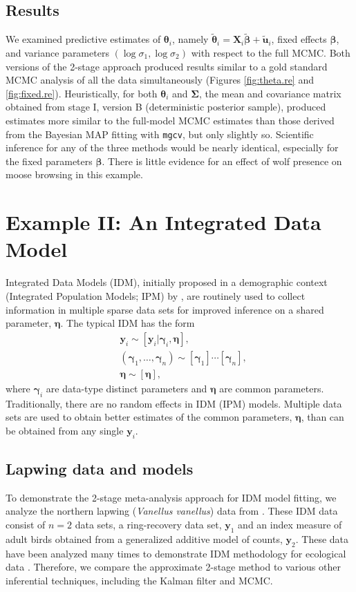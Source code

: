 \documentclass[12pt]{article}
\newcommand{\by}{\mathbf{y}}
\newcommand{\bt}{\boldsymbol{\theta}}
\newcommand{\bb}{\boldsymbol{\beta}}
\newcommand{\bn}{\boldsymbol{\eta}}
\newcommand{\bg}{\boldsymbol{\gamma}}
\newcommand{\bSig}{\boldsymbol{\Sigma}}
\newcommand{\bX}{\mathbf{X}}
\newcommand{\bu}{\mathbf{u}}
\begin{document}
\subsection{Results}
We examined predictive estimates of $\bt_i$, namely $\tilde{\bt}_i = \bX_i\tilde{\bb} + \tilde{\bu}_i$, fixed effects $\bb$, and variance parameters $(\log\sigma_1, \log\sigma_2)$ with respect to the full MCMC. Both versions of the 2-stage approach produced results similar to a gold standard MCMC analysis of all the data simultaneously (Figures \ref{fig:theta.re} and \ref{fig:fixed.re}). Heuristically, for both $\bt_i$ and $\bSig$,  the mean and covariance matrix obtained from stage I, version B (deterministic posterior sample), produced estimates more similar to the full-model MCMC estimates than those derived from the Bayesian MAP fitting with {\tt mgcv}, but only slightly so. Scientific inference for any of the three methods would be nearly identical, especially for the fixed parameters $\bb$. There is little evidence for an effect of wolf presence on moose browsing in this example. 



\section{Example II: An Integrated Data Model}

Integrated Data Models (IDM), initially proposed in a demographic context (Integrated Population Models; IPM) by \cite{besbeas2002integrating}, are routinely used to collect information in multiple sparse data sets for improved inference on a shared parameter, $\bn$. The typical IDM \citep{schaub2011integrated} has the form
\[
\begin{aligned}
&\by_i \sim [\by_i|\bg_i, \bn], \\
&(\bg_1,\dots,\bg_n) \sim [\bg_1]\cdots[\bg_n],\\
&\bn \sim [\bn],
\end{aligned}
\]
where $\bg_i$ are data-type distinct parameters and $\bn$ are common parameters. Traditionally, there are no random effects in IDM (IPM) models. Multiple data sets are used to obtain better estimates of the common parameters, $\bn$, than can be obtained from any single $\by_i$. 

\subsection{Lapwing data and models}

To demonstrate the 2-stage meta-analysis approach for IDM model fitting, we analyze the northern lapwing ({\it Vanellus vanellus}) data from \cite{besbeas2002integrating}. These IDM data consist of $n=2$ data sets, a ring-recovery data set, $\by_1$ and an index measure of adult birds obtained from a generalized additive model of counts, $\by_2$. These data have been analyzed many times to demonstrate IDM methodology for ecological data \citep{besbeas2002integrating, Brooks:2004zi, besbeas2019exact, goudie2019joining}. Therefore, we compare the approximate 2-stage method to various other inferential techniques, including the Kalman filter and MCMC. 
\end{document}

